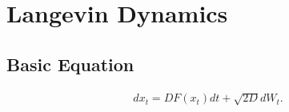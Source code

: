 \chapter{Langevin Dynamics}
\section{Basic Equation}
\begin{definition}
\begin{align}
        dx_t=D F(x_t)dt  + \sqrt{2D}d{W}_t.
\end{align}
\label{langevin}
\end{definition}
